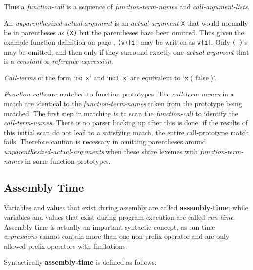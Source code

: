 \documentclass[12pt]{article}
\newcommand{\key}[1]{{\rm \bfseries #1}}
\begin{document}
Thus a {\em function-call} is a sequence of {\em function-term-names}
and {\em call-argument-lists}.

An {\em unparenthesized-actual-argument} is an {\em actual-argument}
{\tt X} that would normally be in parentheses as {\tt (X)} but the
parentheses have been omitted.  Thus given the example function definition
on page \pageref{REFERENCE-EXPRESSION-FUNCTION-EXAMPLE},
{\tt (v)[i]} may be written as {\tt v[i]}.  Only {\tt (~)}'s may be
omitted, and then only if they surround exactly one {\em actual-argument}
that is a {\em constant} or {\em reference-expression}.

{\em Call-terms} of the form `{\tt no x}' and `{\tt not x}' are
equivalent to `{x ( false )}'.

{\em Function-calls} are matched to function prototypes.  The
{\em call-term-names} in a match are identical to the
{\em function-term-names} taken from the prototype being matched.  The first
step in matching is to scan the {\em function-call} to identify the
{\em call-term-names}.  There is no parser backing up after this is
done: if the results of this initial scan do not lead to a satisfying
match, the entire call-prototype match fails.  Therefore caution
is necessary in omitting parentheses around
{\em unparenthesized-actual-arguments} when these share lexemes with
{\em function-term-names} in some function prototypes.

\subsection{Assembly Time}
\label{ASSEMBLY-TIME}

Variables and values that exist during assembly are called
\key{assembly-time}, while variables and values that exist during
program execution are called {\em run-time}.  Assembly-time
is actually an important syntactic concept, as run-time
{\em expressions} cannot contain more than one non-prefix operator
and are only allowed prefix operators with limitations.

Syntactically \key{assembly-time} is defined as follows:
\end{document}
